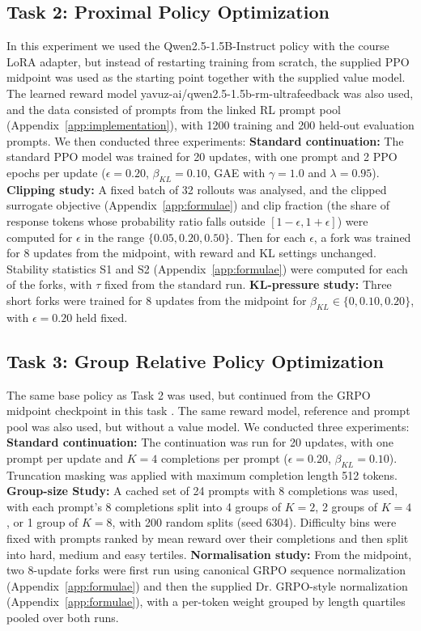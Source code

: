 \documentclass{article}
\begin{document}
\subsection{Task 2: Proximal Policy Optimization}
\label{subsec:methods-task2}
 In this experiment we used the Qwen2.5-1.5B-Instruct policy \citep{qwen2025qwen25} with the course LoRA adapter, but instead of restarting training from scratch, the supplied PPO midpoint \citep{schulman2017ppo} was used as the starting point together with the supplied value model. The learned reward model yavuz-ai/qwen2.5-1.5b-rm-ultrafeedback was also used, and the data consisted of prompts from the linked RL prompt pool (Appendix~\ref{app:implementation}), with 1200 training and 200 held-out evaluation prompts. We then conducted three experiments: \noindent\textbf{Standard continuation:} The standard PPO model was trained for 20 updates, with one prompt and 2 PPO epochs per update ($\epsilon = 0.20$, $\beta_{KL} = 0.10$, GAE with $\gamma = 1.0$ \citep{schulman2016gae} and $\lambda = 0.95$). \noindent\textbf{Clipping study:} A fixed batch of 32 rollouts was analysed, and the clipped surrogate objective (Appendix~\ref{app:formulae}) and clip fraction (the share of response tokens whose probability ratio falls outside $[1-\epsilon, 1+\epsilon]$) were computed for $\epsilon$ in the range $\{0.05, 0.20, 0.50\}$. Then for each $\epsilon$, a fork was trained for 8 updates from the midpoint, with reward and KL settings unchanged. Stability statistics S1 and S2 (Appendix~\ref{app:formulae}) were computed for each of the forks, with $\tau$ fixed from the standard run. \noindent\textbf{KL-pressure study:} Three short forks were trained for 8 updates from the midpoint for $\beta_{KL} \in \{0, 0.10, 0.20\}$, with $\epsilon = 0.20$ held fixed.

\subsection{Task 3: Group Relative Policy Optimization }
\label{subsec:methods-task3}
 The same base policy as Task 2 was used, but continued from the GRPO midpoint checkpoint in this task \citep{shao2024deepseekmath}. The same reward model, reference and prompt pool was also used, but without a value model. We conducted three experiments: \noindent\textbf{Standard continuation:} The continuation was run for 20 updates, with one prompt per update and $K=4$ completions per prompt ($\epsilon = 0.20$, $\beta_{KL} = 0.10$). Truncation masking was applied with maximum completion length 512 tokens. \noindent\textbf{Group-size Study:} A cached set of 24 prompts with 8 completions was used, with each prompt's 8 completions split into 4 groups of $K=2$, 2 groups of $K=4$, or 1 group of $K=8$, with 200 random splits (seed 6304). Difficulty bins were fixed with prompts ranked by mean reward over their completions and then split into hard, medium and easy tertiles. \noindent\textbf{Normalisation study:} From the midpoint, two 8-update forks were first run using canonical GRPO sequence normalization (Appendix~\ref{app:formulae}) and then the supplied Dr. GRPO-style normalization \citep{liu2025drgrpo} (Appendix~\ref{app:formulae}), with a per-token weight grouped by length quartiles pooled over both runs.
\end{document}

